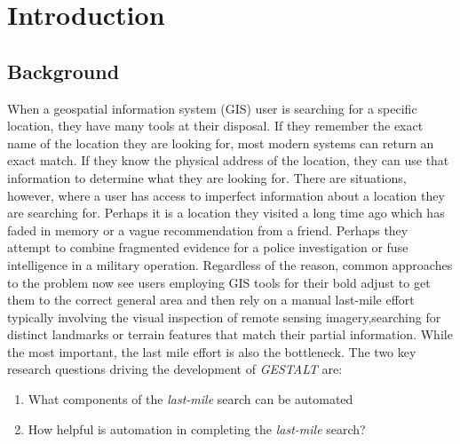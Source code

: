 \section{Introduction}
\label{section:introduction}

\subsection{Background}
When a geospatial information system (GIS) user is searching for a specific location, they have many tools at their disposal. 
If they remember the exact name of the location they are looking for, most modern systems can return an exact match. 
If they know the physical address of the location, they can use that information to determine what they are looking for.
There are situations, however, where a user has access to imperfect information about a location they are searching for. 
Perhaps it is a location they visited a long time ago which has faded in memory or a vague recommendation from a friend. 
Perhaps they attempt to combine fragmented evidence for a police investigation or fuse intelligence in a military operation.
Regardless of the reason, common approaches to the problem now see users employing GIS tools for their bold adjust to get them to the correct general area and then rely on a manual last-mile effort typically involving the visual inspection of remote sensing imagery,searching for distinct landmarks or terrain features that match their partial information. 
While the most important, the last mile effort is also the bottleneck.
The two key research questions driving the development of \textit{GESTALT} are:
\begin{enumerate}
\item What components of the \textit{last-mile} search can be automated
\item How helpful is automation in completing the \textit{last-mile} search?
\end{enumerate}

